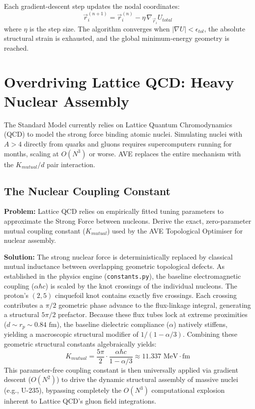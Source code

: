 Each gradient-descent step updates the nodal coordinates:
\begin{equation}
    \vec{r}_i^{(n+1)} = \vec{r}_i^{(n)} - \eta \, \nabla_{\vec{r}_i} U_{total}
\end{equation}
where $\eta$ is the step size. The algorithm converges when $|\nabla U| < \epsilon_{tol}$, the absolute structural strain is exhausted, and the global minimum-energy geometry is reached.

\section{Overdriving Lattice QCD: Heavy Nuclear Assembly}
\label{sec:overdrive_nuclear}

The Standard Model currently relies on Lattice Quantum Chromodynamics (QCD) to model the strong force binding atomic nuclei. Simulating nuclei with $A > 4$ directly from quarks and gluons requires supercomputers running for months, scaling at $O(N^3)$ or worse. AVE replaces the entire mechanism with the $K_{mutual}/d$ pair interaction.

\subsection{The Nuclear Coupling Constant}

\begin{examplebox}
\textbf{Problem:} Lattice QCD relies on empirically fitted tuning parameters to approximate the Strong Force between nucleons. Derive the exact, zero-parameter mutual coupling constant ($K_{mutual}$) used by the AVE Topological Optimiser for nuclear assembly.

\textbf{Solution:} The strong nuclear force is deterministically replaced by classical mutual inductance between overlapping geometric topological defects. As established in the physics engine (\texttt{constants.py}), the baseline electromagnetic coupling ($\alpha \hbar c$) is scaled by the knot crossings of the individual nucleons.
The proton's $(2,5)$ cinquefoil knot contains exactly five crossings. Each crossing contributes a $\pi/2$ geometric phase advance to the flux-linkage integral, generating a structural $5\pi/2$ prefactor.
Because these flux tubes lock at extreme proximities ($d \sim r_p \sim 0.84\text{ fm}$), the baseline dielectric compliance ($\alpha$) natively stiffens, yielding a macroscopic structural modifier of $1/(1-\alpha/3)$.
Combining these geometric structural constants algebraically yields:
\[ K_{mutual} = \frac{5\pi}{2} \cdot \frac{\alpha \hbar c}{1 - \alpha/3} \approx 11.337 \text{ MeV} \cdot \text{fm} \]
This parameter-free coupling constant is then universally applied via gradient descent ($O(N^2)$) to drive the dynamic structural assembly of massive nuclei (e.g., U-235), bypassing completely the $O(N^3)$ computational explosion inherent to Lattice QCD's gluon field integrations.
\end{examplebox}

